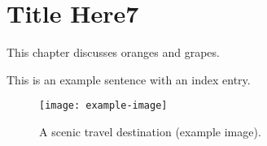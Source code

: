 \newpage
\chapter{Title Here7}


This chapter discusses oranges and grapes.




This is an example sentence with an index entry.
\lipsum[1]  %
\begin{figure}[htbp]
  \centering
  \texttt{[image: example-image]} %
  \caption{A scenic travel destination (example image).}
\end{figure}
\lipsum[1]  %
\lipsum[2]  %




